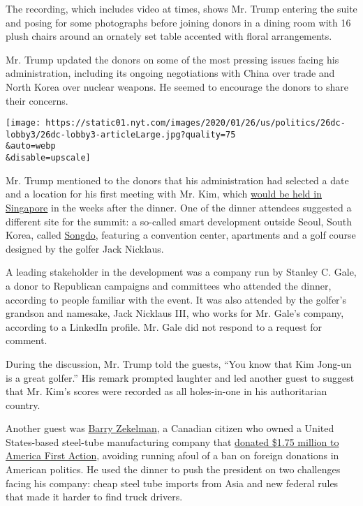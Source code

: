 The recording, which includes video at times, shows Mr. Trump entering
the suite and posing for some photographs before joining donors in a
dining room with 16 plush chairs around an ornately set table accented
with floral arrangements.

Mr. Trump updated the donors on some of the most pressing issues facing
his administration, including its ongoing negotiations with China over
trade and North Korea over nuclear weapons. He seemed to encourage the
donors to share their concerns.

\texttt{[image: https://static01.nyt.com/images/2020/01/26/us/politics/26dc-lobby3/26dc-lobby3-articleLarge.jpg?quality=75\\\&auto=webp\\\&disable=upscale]}

Mr. Trump mentioned to the donors that his administration had selected a
date and a location for his first meeting with Mr. Kim, which
\href{https://www.nytimes.com/2018/06/12/world/asia/north-korea-summit.html}{would
be held in Singapore} in the weeks after the dinner. One of the dinner
attendees suggested a different site for the summit: a so-called smart
development outside Seoul, South Korea, called
\href{https://www.wsj.com/articles/developer-feuds-with-korean-partner-over-busted-smart-city-11560261729}{Songdo},
featuring a convention center, apartments and a golf course designed by
the golfer Jack Nicklaus.

A leading stakeholder in the development was a company run by Stanley C.
Gale, a donor to Republican campaigns and committees who attended the
dinner, according to people familiar with the event. It was also
attended by the golfer's grandson and namesake, Jack Nicklaus III, who
works for Mr. Gale's company, according to a LinkedIn profile. Mr. Gale
did not respond to a request for comment.

During the discussion, Mr. Trump told the guests, ``You know that Kim
Jong-un is a great golfer.'' His remark prompted laughter and led
another guest to suggest that Mr. Kim's scores were recorded as all
holes-in-one in his authoritarian country.

Another guest was
\href{https://www.nytimes.com/2019/05/20/us/politics/hes-one-of-the-biggest-backers-of-trumps-push-to-protect-american-steel-and-hes-canadian.html}{Barry
Zekelman}, a Canadian citizen who owned a United States-based steel-tube
manufacturing company that
\href{https://www.nytimes.com/2019/05/20/us/politics/hes-one-of-the-biggest-backers-of-trumps-push-to-protect-american-steel-and-hes-canadian.html}{donated
\$1.75 million to America First Action}, avoiding running afoul of a ban
on foreign donations in American politics. He used the dinner to push
the president on two challenges facing his company: cheap steel tube
imports from Asia and new federal rules that made it harder to find
truck drivers.

